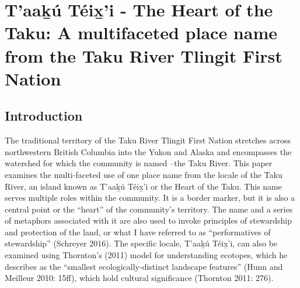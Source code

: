 \chapter[T'aak̲ú Téix̲'i - The Heart of the Taku]{\vspace{-25pt}T'aak̲ú Téix̲'i - The Heart of the Taku:
A multifaceted place name from the Taku River Tlingit First Nation
}






\def\authorlast{Schreyer}

\renewcommand{\beginchapter}{\pageref{schreyer-ch-begin}}
\renewcommand{\finishchapter}{\pageref{schreyer-ch-end}}
\label{schreyer-ch-begin}



\thispagestyle{firststyle}



\section{Introduction}

The traditional territory of the Taku River Tlingit First Nation stretches across northwestern British Columbia into the Yukon and Alaska and encompasses the watershed for which the community is named –the Taku River. This paper examines the multi-faceted use of one place name from the locale of the Taku River, an island known as T'aak̲ú Téix̲'i or the Heart of the Taku. This name serves multiple roles within the community. It is a border marker, but it is also a central point or the “heart” of the community’s territory. The name and a series of metaphors associated with it are also used to invoke principles of stewardship and protection of the land, or what I have referred to as “performatives of stewardship” (Schreyer 2016). The specific locale, T'aak̲ú Téix̲'i, can also be examined using Thornton’s (2011) model for understanding ecotopes, which he describes as the “smallest ecologically-distinct landscape features” (Hunn and Meilleur 2010: 15ff), which hold cultural significance (Thornton 2011: 276).

